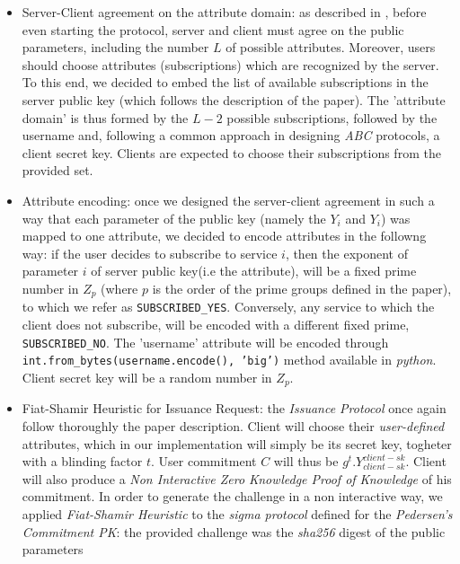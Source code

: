 \documentclass[10pt,conference,compsocconf]{IEEEtran}
\begin{document}
\begin{itemize}
    \item Server-Client agreement on the attribute domain: as described in \cite{PS_signature}, before even starting the protocol,
    server and client must agree on the public parameters, including the number $L$ of possible attributes. Moreover, users should choose
    attributes (subscriptions) which are recognized by the server. To this end, we decided to embed the list of available subscriptions
    in the server public key (which follows the description of the paper). The 'attribute domain' is thus formed by the $L-2$ possible
    subscriptions, followed by the username and, following a common approach in designing \textit{ABC} protocols, a client secret key.
    Clients are expected to choose their subscriptions from the provided set.
    \item Attribute encoding: once we designed the server-client agreement in such a way that each parameter of the public key
    (namely the $Y_i$ and $Y^{~}_{i}$) was mapped to one attribute, we decided to encode attributes in the followng way:
    if the user decides to subscribe to service $i$, then the exponent of parameter $i$ of server public key(i.e the attribute),
     will be a fixed prime number in $Z_p$ (where $p$ is the order of the prime groups defined in the paper),
    to which we refer as \texttt{SUBSCRIBED_YES}. Conversely, any service to which the client does not subscribe,
    will be encoded with a different fixed prime, \texttt{SUBSCRIBED_NO}. The 'username' attribute will be encoded through
    \texttt{int.from_bytes(username.encode(), 'big')} method available in \textit{python}. Client secret key will be a
    random number in $Z_p$.
    \item Fiat-Shamir Heuristic for Issuance Request: the \textit{Issuance Protocol} once again follow thoroughly the paper description.
    Client will choose their \textit{user-defined} attributes, which in our implementation will simply be its secret key,
    togheter with a blinding factor $t$. User commitment $C$ will thus be $g^t.Y_{client-sk}^{client-sk}$. Client will also produce a
    \textit{Non Interactive Zero Knowledge Proof of Knowledge} of his commitment. In order to generate the challenge in a
    non interactive way, we applied \textit{Fiat-Shamir Heuristic} to the \textit{sigma protocol} defined for the
    \textit{Pedersen's Commitment PK}: the provided challenge was the \textit{sha256} digest of the public parameters
\end{itemize}
\end{document}
